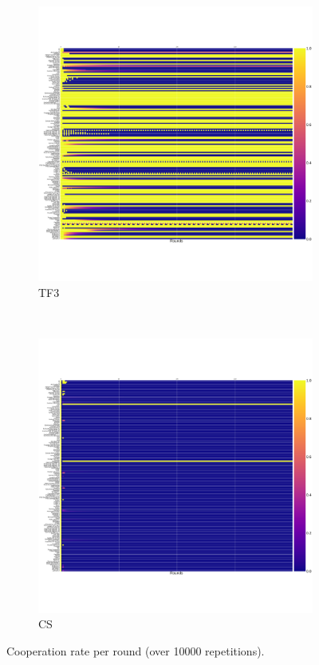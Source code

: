 \documentclass[10pt,journal]{IEEEtran}
\begin{document}
\begin{figure}[!hbtp]
    \begin{subfigure}[t]{.5\columnwidth}
        \centering
        \includegraphics[width=\columnwidth]{img/cooperation_0_0_10000_TF3_array.pdf}
        \caption{TF3}
    \end{subfigure}%
    ~
    \begin{subfigure}[t]{.5\columnwidth}
        \centering
        \includegraphics[width=\columnwidth]{img/cooperation_0_0_10000_CS_array.pdf}
        \caption{CS}
    \end{subfigure}
    \caption{Cooperation rate per round (over 10000 repetitions).}
    \label{fig:cooperation_rates}
\end{figure}
\end{document}
